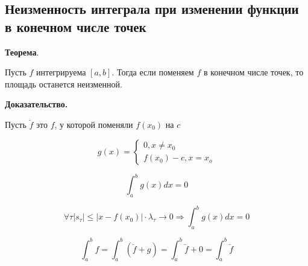 \documentclass[a4paper]{article}
\begin{document}
\begin{definit}
\hypertarget{p9}{}
\subsection*{Неизменность интеграла при изменении функции в конечном числе точек}
\begin{htheorem}\textbf{Теорема}.

Пусть $f$ интегрируема $[a,b]$. Тогда если поменяем $f$ в конечном числе точек, то площадь останется неизменной.
\end{htheorem}


\begin{hproof}\textbf{Доказательство.}

Пусть $\breve{f}$ это $f$, у которой поменяли $f(x_0)$ на $c$

\[
g(x) = \begin{cases} 0, x \neq x_0 \\ f(x_0) - c, x=x_o  \end{cases}
\]

\[
\int_a^b g(x)dx = 0
\]

\[
\forall \tau |s_\tau| \leq |x - f(x_0)| \cdot \lambda_\tau \rightarrow 0 \Rightarrow \int_a^b g(x)dx = 0
\]

\[
\int_a^b f = \int_a^b (\breve{f} + g) = \int_a^b \breve{f} + 0 =  \int_a^b \breve{f}
\]
\end{hproof}
\end{definit}
\end{document}
